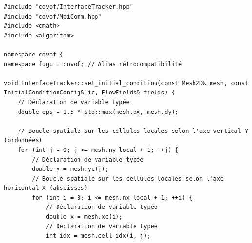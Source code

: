 \documentclass[10pt,a4paper,oneside]{book}
\begin{document}
\begin{lstlisting}[language={[11]C++}]
#include "covof/InterfaceTracker.hpp"
#include "covof/MpiComm.hpp"
#include <cmath>
#include <algorithm>

namespace covof {
namespace fugu = covof; // Alias rétrocompatibilité

void InterfaceTracker::set_initial_condition(const Mesh2D& mesh, const InitialConditionConfig& ic, FlowFields& fields) {
    // Déclaration de variable typée
    double eps = 1.5 * std::max(mesh.dx, mesh.dy);

    // Boucle spatiale sur les cellules locales selon l'axe vertical Y (ordonnées)
    for (int j = 0; j <= mesh.ny_local + 1; ++j) {
        // Déclaration de variable typée
        double y = mesh.yc(j);
        // Boucle spatiale sur les cellules locales selon l'axe horizontal X (abscisses)
        for (int i = 0; i <= mesh.nx_local + 1; ++i) {
            // Déclaration de variable typée
            double x = mesh.xc(i);
            // Déclaration de variable typée
            int idx = mesh.cell_idx(i, j);


\end{lstlisting}
\end{document}
